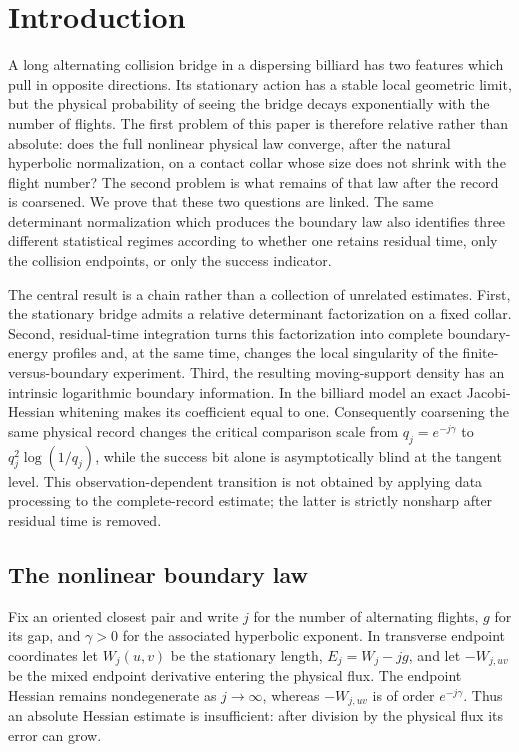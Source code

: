 \section{Introduction}
\label{sec:geometric-results}

A long alternating collision bridge in a dispersing billiard has two
features which pull in opposite directions.  Its stationary action has a
stable local geometric limit, but the physical probability of seeing the
bridge decays exponentially with the number of flights.  The first problem
of this paper is therefore relative rather than absolute: does the full
nonlinear physical law converge, after the natural hyperbolic
normalization, on a contact collar whose size does not shrink with the
flight number?  The second problem is what remains of that law after the
record is coarsened.  We prove that these two questions are linked.  The
same determinant normalization which produces the boundary law also
identifies three different statistical regimes according to whether one
retains residual time, only the collision endpoints, or only the success
indicator.

The central result is a chain rather than a collection of unrelated
estimates.  First, the stationary bridge admits a relative determinant
factorization on a fixed collar.  Second, residual-time integration turns
this factorization into complete boundary-energy profiles and, at the same
time, changes the local singularity of the finite-versus-boundary
experiment.  Third, the resulting moving-support density has an intrinsic
logarithmic boundary information.  In the billiard model an exact
Jacobi-Hessian whitening makes its coefficient equal to one.  Consequently
coarsening the same physical record changes the critical comparison scale
from $q_j=e^{-j\gamma}$ to
$q_j^2\log(1/q_j)$, while the success bit alone is asymptotically blind at
the tangent level.  This observation-dependent transition is not obtained
by applying data processing to the complete-record estimate; the latter is
strictly nonsharp after residual time is removed.

\subsection{The nonlinear boundary law}
Fix an oriented closest pair and write $j$ for the number of alternating
flights, $g$ for its gap, and $\gamma>0$ for the associated hyperbolic
exponent.  In transverse endpoint coordinates let $W_j(u,v)$ be the
stationary length, $E_j=W_j-jg$, and let $-W_{j,uv}$ be the mixed endpoint
derivative entering the physical flux.  The endpoint Hessian remains
nondegenerate as $j\to\infty$, whereas $-W_{j,uv}$ is of order
$e^{-j\gamma}$.  Thus an absolute Hessian estimate is insufficient: after
division by the physical flux its error can grow.

